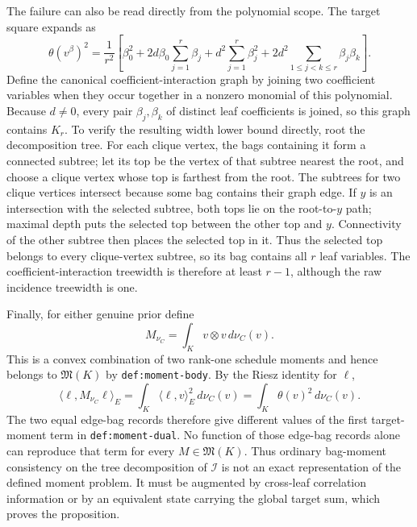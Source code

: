 The failure can also be read directly from the polynomial scope.  The target square expands as
\[
 \theta(v^\beta)^2
 =\frac1{r^2}\left[
 \beta_0^2+2d\beta_0\sum_{j=1}^r\beta_j
 +d^2\sum_{j=1}^r\beta_j^2
 +2d^2\sum_{1\le j<k\le r}\beta_j\beta_k
 \right].
\]
Define the canonical coefficient-interaction graph by joining two coefficient variables when they occur together in a nonzero monomial of this polynomial.  Because \(d\ne0\), every pair \(\beta_j,\beta_k\) of distinct leaf coefficients is joined, so this graph contains \(K_r\).  To verify the resulting width lower bound directly, root the decomposition tree.  For each clique vertex, the bags containing it form a connected subtree; let its top be the vertex of that subtree nearest the root, and choose a clique vertex whose top is farthest from the root.  The subtrees for two clique vertices intersect because some bag contains their graph edge.  If \(y\) is an intersection with the selected subtree, both tops lie on the root-to-\(y\) path; maximal depth puts the selected top between the other top and \(y\).  Connectivity of the other subtree then places the selected top in it.  Thus the selected top belongs to every clique-vertex subtree, so its bag contains all \(r\) leaf variables.  The coefficient-interaction treewidth is therefore at least \(r-1\), although the raw incidence treewidth is one.

Finally, for either genuine prior define
\[
 M_{\nu_C}=\int_K v\otimes v\,d\nu_C(v).
\]
This is a convex combination of two rank-one schedule moments and hence belongs to \(\mathfrak M(K)\) by \texttt{def:moment-body}.  By the Riesz identity for \(\ell\),
\[
 \langle\ell,M_{\nu_C}\ell\rangle_E
 =\int_K\langle\ell,v\rangle_E^2\,d\nu_C(v)
 =\int_K\theta(v)^2\,d\nu_C(v).
\]
The two equal edge-bag records therefore give different values of the first target-moment term in \texttt{def:moment-dual}.  No function of those edge-bag records alone can reproduce that term for every \(M\in\mathfrak M(K)\).  Thus ordinary bag-moment consistency on the tree decomposition of \(\mathcal I\) is not an exact representation of the defined moment problem.  It must be augmented by cross-leaf correlation information or by an equivalent state carrying the global target sum, which proves the proposition.